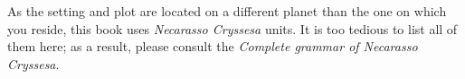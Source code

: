 
As the setting and plot are located on a different planet than the one on which you reside, this book uses \emph{Necarasso Cryssesa} units. It is too tedious to list all of them here; as a result, please consult the \emph{Complete grammar of Necarasso Cryssesa}.